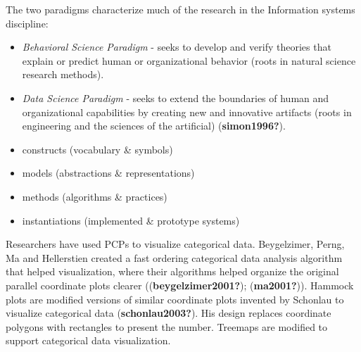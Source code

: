 \documentclass[print]{nuthesis}
\providecommand{\tightlist}{%
  \setlength{\itemsep}{0pt}\setlength{\parskip}{0pt}}
\begin{document}

The two paradigms characterize much of the research in the Information systems discipline:

\begin{itemize}
\tightlist
\item
  \emph{Behavioral Science Paradigm} - seeks to develop and verify theories that explain or predict human or organizational behavior (roots in natural science research methods).
\item
  \emph{Data Science Paradigm} - seeks to extend the boundaries of human and organizational capabilities by creating new and innovative artifacts (roots in engineering and the sciences of the artificial) (\textbf{simon1996?}).
\end{itemize}


\begin{itemize}
\tightlist
\item
  constructs (vocabulary \& symbols)
\item
  models (abstractions \& representations)
\item
  methods (algorithms \& practices)
\item
  instantiations (implemented \& prototype systems)
\end{itemize}


Researchers have used PCPs to visualize categorical data.
Beygelzimer, Perng, Ma and Hellerstien created a fast ordering categorical data analysis algorithm that helped visualization, where their algorithms helped organize the original parallel coordinate plots clearer ((\textbf{beygelzimer2001?}); (\textbf{ma2001?})).
Hammock plots are modified versions of similar coordinate plots invented by Schonlau to visualize categorical data (\textbf{schonlau2003?}).
His design replaces coordinate polygons with rectangles to present the number.
Treemaps are modified to support categorical data visualization.
\end{document}
